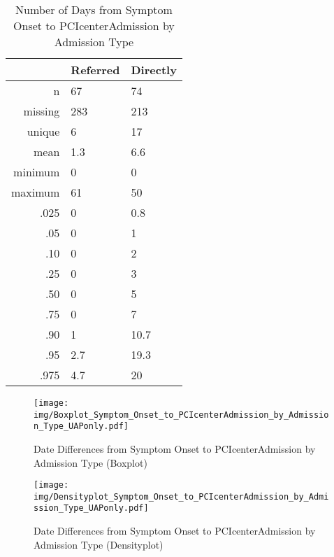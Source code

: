 \documentclass[a4paper]{report}
\begin{document}
\begin{itemize}
{%
\begin{table}[ht]
\centering
\begin{tabular}{rll}
  \toprule
 & Referred & Directly \\ 
  \midrule
n & 67 & 74 \\ 
  missing & 283 & 213 \\ 
  unique & 6 & 17 \\ 
  mean & 1.3 & 6.6 \\ 
  minimum & 0 & 0 \\ 
  maximum & 61 & 50 \\ 
  .025 & 0 & 0.8 \\ 
  .05 & 0 & 1 \\ 
  .10 & 0 & 2 \\ 
  .25 & 0 & 3 \\ 
  .50 & 0 & 5 \\ 
  .75 & 0 & 7 \\ 
  .90 & 1 & 10.7 \\ 
  .95 & 2.7 & 19.3 \\ 
  .975 & 4.7 & 20 \\ 
   \bottomrule
\end{tabular}
\caption{Number of Days from Symptom Onset to PCIcenterAdmission by Admission Type} 
\end{table}
\begin{figure}
  \centering
  \caption{Date Differences from Symptom Onset to PCIcenterAdmission by Admission Type (Boxplot)}
  \label{Boxplot: Date Differences from Symptom Onset to PCIcenterAdmission by Admission Type}
\texttt{[image: img/Boxplot\_Symptom\_Onset\_to\_PCIcenterAdmission\_by\_Admission\_Type\_UAPonly.pdf]}\end{figure}


\begin{figure}
  \centering
  \caption{Date Differences from Symptom Onset to PCIcenterAdmission by Admission Type (Densityplot)}
  \label{Density: Date Differences from Symptom Onset to PCIcenterAdmission by Admission Type}
\texttt{[image: img/Densityplot\_Symptom\_Onset\_to\_PCIcenterAdmission\_by\_Admission\_Type\_UAPonly.pdf]}\end{figure}


\clearpage

}
\end{itemize}
\end{document}
